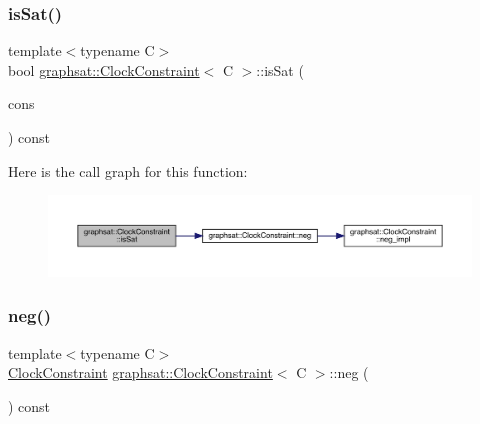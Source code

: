 \mbox{\label{classgraphsat_1_1_clock_constraint_aa4beb1eb7911ff6c503e4008ae3718ab}} 
\subsubsection{\texorpdfstring{isSat()}{isSat()}}
{\footnotesize\ttfamily template$<$typename C$>$ \\
bool \mbox{\hyperlink{classgraphsat_1_1_clock_constraint}{graphsat\+::\+Clock\+Constraint}}$<$ C $>$\+::is\+Sat (\begin{DoxyParamCaption}\item[{const \mbox{\hyperlink{classgraphsat_1_1_clock_constraint}{Clock\+Constraint}}$<$ C $>$ \&}]{cons }\end{DoxyParamCaption}) const\hspace{0.3cm}{\ttfamily [inline]}}

Here is the call graph for this function\+:\nopagebreak
\begin{figure}[H]
\begin{center}
\leavevmode
\includegraphics[width=350pt]{classgraphsat_1_1_clock_constraint_aa4beb1eb7911ff6c503e4008ae3718ab_cgraph}
\end{center}
\end{figure}
\mbox{\label{classgraphsat_1_1_clock_constraint_a561831532370518c82b43f6e8a3a5c9e}} 
\subsubsection{\texorpdfstring{neg()}{neg()}}
{\footnotesize\ttfamily template$<$typename C$>$ \\
\mbox{\hyperlink{classgraphsat_1_1_clock_constraint}{Clock\+Constraint}} \mbox{\hyperlink{classgraphsat_1_1_clock_constraint}{graphsat\+::\+Clock\+Constraint}}$<$ C $>$\+::neg (\begin{DoxyParamCaption}\item[{void}]{ }\end{DoxyParamCaption}) const\hspace{0.3cm}{\ttfamily [inline]}}

